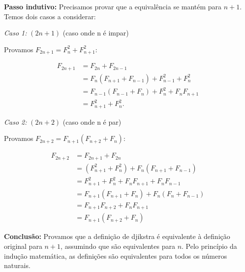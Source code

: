 \documentclass[11pt,reqno,a4paper]{amsart}
\begin{document}
\textbf{Passo indutivo:}
Precisamos provar que a equivalência se mantém para $n+1$. Temos dois casos a considerar:

\textit{Caso 1:} $(2n+1)$ (caso onde n é impar)

Provamos $F_{2n+1} = F_n^2 + F_{n+1}^2$:

\begin{align*}
F_{2n+1} &= F_{2n}+F_{2n-1} \\
&= F_{n}(F_{n+1}+F_{n-1}) + F_{n-1}^2+ F_n^2 \\
&= F_{n-1}(F_{n-1}+F_n)+F_n^2+F_nF_{n+1} \\
&= F_{n+1}^2+F_{n}^2.
\end{align*}

\textit{Caso 2:} $(2n+2)$ (caso onde n é par)

Provamos $F_{2n+2} = F_{n+1}(F_{n+2} + F_n)$:

\begin{align*}
F_{2n+2} &= F_{2n+1} + F_{2n} \\
&= (F_{n+1}^2 + F_n^2) + F_n(F_{n+1} + F_{n-1}) \\
&= F_{n+1}^2 + F_n^2 + F_n F_{n+1} + F_n F_{n-1} \\
&= F_{n+1}(F_{n+1} + F_n) + F_n(F_n + F_{n-1}) \\
&= F_{n+1}F_{n+2} + F_n F_{n+1} \\
&= F_{n+1}(F_{n+2} + F_n)
\end{align*}

\textbf{Conclusão:}
Provamos que a definição de djikstra é equivalente à definição original para $n+1$, assumindo que são equivalentes para $n$. Pelo princípio da indução matemática, as definições são equivalentes para todos os números naturais.

\endgroup
\end{document}
